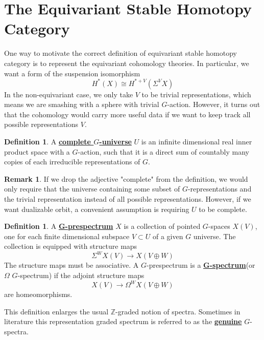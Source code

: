 \documentclass{article}
\theoremstyle{definition}
\newtheorem{definition}[theorem]{Definition}
\newtheorem{remark}[theorem]{Remark}
\begin{document}
\section{The Equivariant Stable Homotopy Category}
One way to motivate the correct definition of equivariant stable homotopy category is to represent the equivariant cohomology theories. In particular, we want a form of the suspension isomorphism
\[H^*(X)\cong H^{*+V}(\Sigma^VX)\]
In the non-equivariant case, we only take $V$ to be trivial representations, which means we are smashing with a sphere with trivial $G$-action. However, it turns out that the cohomology would carry more useful data if we want to keep track all possible representations $V$. 


\begin{tcolorbox}[colback=purple!5!white,colframe=purple!75!black]
\begin{definition}
A \underline{\textbf{complete $G$-universe}} $U$ is an infinite dimensional real inner product space with a $G$-action, such that it is a direct sum of countably many copies of each irreducible representations of $G$. 
\end{definition}
\end{tcolorbox}


\begin{tcolorbox}[colback=green!5!white,colframe=green!30!white]
\begin{remark}
If we drop the adjective "complete" from the definition, we would only require that the universe containing some subset of $G$-representations and the trivial representation instead of all possible representations. However, if we want dualizable orbit, a convenient assumption is requiring $U$ to be complete.  
\end{remark}
\end{tcolorbox}


\begin{tcolorbox}[colback=purple!5!white,colframe=purple!75!black]
\begin{definition}
\label{Gspectrum}
A \underline{\textbf{G-prespectrum}} $X$ is a collection of pointed $G$-spaces $X(V)$, one for each finite dimensional subspace $V\subset U$ of a given $G$ universe. The collection is equipped with structure maps 
\[\Sigma^WX(V)\to X(V\oplus W)\]
The structure maps must be associative. A $G$-prespectrum is a \underline{\textbf{G-spectrum}}(or $\Omega$ $G$-spectrum) if the adjoint structure maps 
\[X(V)\to \Omega^WX(V\oplus W)\] 
are homeomorphisms.
\end{definition}
\end{tcolorbox}
This definition enlarges the usual $\mathbb{Z}$-graded notion of spectra. Sometimes in literature this representation graded spectrum is referred to as the \underline{\textbf{genuine}} $G$-spectra. 
\end{document}

